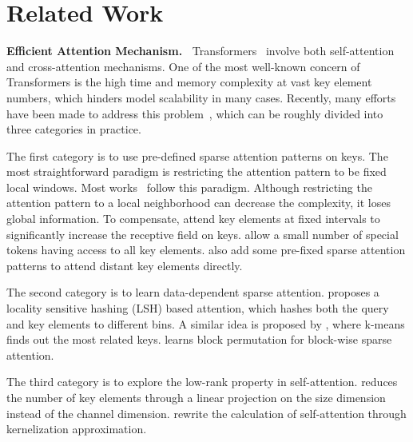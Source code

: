 \section{Related Work}



\textbf{Efficient Attention Mechanism.~}
Transformers~\citep{vaswani2017attention} involve both self-attention and cross-attention mechanisms. One of the most well-known concern of Transformers is the high time and memory complexity at vast key element numbers, which hinders model scalability in many cases. Recently, many efforts have been made to address this problem~\citep{tay2020efficient}, which can be roughly divided into three categories in practice.


The first category is to use pre-defined sparse attention patterns on keys.
The most straightforward paradigm is restricting the attention pattern to be fixed local windows.
Most works~\citep{liu2018generating,parmar2018image,child2019generating,huang2019ccnet, ho2019axial,wang2020axial,hu2019local,ramachandran2019stand,qiu2019blockwise,beltagy2020longformer,ainslie2020etc,zaheer2020big} follow this paradigm.
Although restricting the attention pattern to a local neighborhood can decrease the complexity, it loses global information.
To compensate, \citet{child2019generating, huang2019ccnet, ho2019axial,wang2020axial} attend key elements at fixed intervals to significantly increase the receptive field on keys.
\citet{beltagy2020longformer,ainslie2020etc,zaheer2020big} allow a small number of special tokens having access to all key elements. \citet{zaheer2020big,qiu2019blockwise} also add some pre-fixed sparse attention patterns to attend distant key elements directly.

The second category is to learn data-dependent sparse attention. \citet{kitaev2020reformer} proposes a locality sensitive hashing (LSH) based attention, which hashes both the query and key elements to different bins. A similar idea is proposed by \citet{roy2020efficient}, where k-means finds out the most related keys. \citet{tay2020sparse} learns block permutation for block-wise sparse attention. 

The third category is to explore the low-rank property in self-attention. \citet{wang2020linformer} reduces the number of key elements through a linear projection on the size dimension instead of the channel dimension. \citet{katharopoulos2020transformers,choromanski2020masked} rewrite the calculation of self-attention through kernelization approximation.

